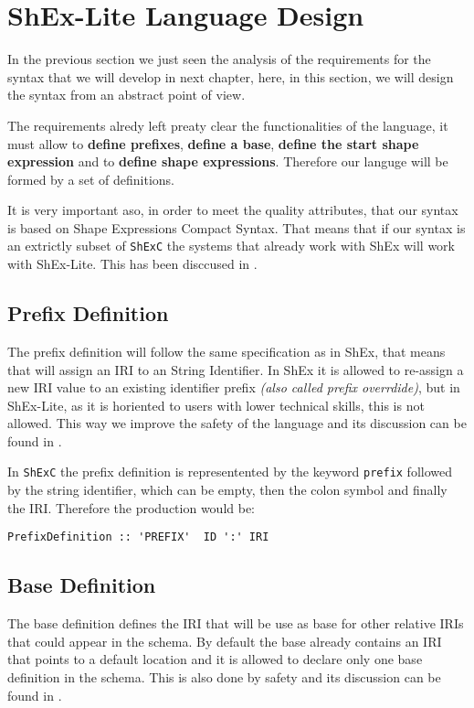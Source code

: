 \section{ShEx-Lite Language Design}

In the previous section we just seen the analysis of the requirements for the
syntax that we will develop in next chapter, here, in this section, we will
design the syntax from an abstract point of view.

The requirements alredy left preaty clear the functionalities of the language,
it must allow to \textbf{define prefixes}, \textbf{define a base}, \textbf{define the start shape expression}
and to \textbf{define shape expressions}. Therefore our languge will be formed by a set of definitions.

It is very important aso, in order to meet the quality attributes, that our syntax is based on Shape Expressions
Compact Syntax. That means that if our syntax is an extrictly subset of \texttt{ShExC} the systems that already
work with ShEx will work with ShEx-Lite. This has been disccused in .

\subsection{Prefix Definition}
The prefix definition will follow the same specification as in ShEx, that means that will assign an IRI to an String Identifier.
In ShEx it is allowed to re-assign a new IRI value to an existing identifier prefix \textit{(also called prefix overrdide)},
but in ShEx-Lite, as it is horiented to users with lower technical skills, this is not allowed.
This way we improve the safety of the language and its discussion can be found in .

In \texttt{ShExC} the prefix definition is representented by the keyword \texttt{prefix} followed by the string identifier, which can
be empty, then the colon symbol and finally the IRI. Therefore the production would be:

\begin{center}
    \begin{verbatim}
PrefixDefinition :: 'PREFIX'  ID ':' IRI
    \end{verbatim}
\end{center}

\subsection{Base Definition}
The base definition defines the IRI that will be use as base for other relative IRIs that could appear in the schema. By default the base
already contains an IRI that points to a default location and it is allowed to declare only one base definition in the schema. This is also done
by safety and its discussion can be found in .

